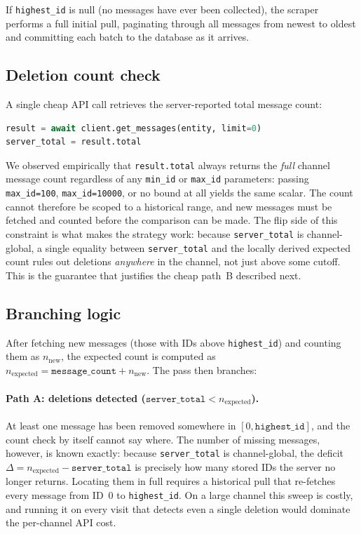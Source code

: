 If \texttt{highest\_id} is null (no messages have ever been collected), the scraper performs a full initial pull, paginating through all messages from newest to oldest and committing each batch to the database as it arrives.

\subsection{Deletion count check}

A single cheap API call retrieves the server-reported total message count:
\begin{lstlisting}[language=Python]
result = await client.get_messages(entity, limit=0)
server_total = result.total
\end{lstlisting}

We observed empirically that \texttt{result.total} always returns the \emph{full} channel message count regardless of any \texttt{min\_id} or \texttt{max\_id} parameters: passing \texttt{max\_id=100}, \texttt{max\_id=10000}, or no bound at all yields the same scalar.
The count cannot therefore be scoped to a historical range, and new messages must be fetched and counted before the comparison can be made.
The flip side of this constraint is what makes the strategy work: because \texttt{server\_total} is channel-global, a single equality between \texttt{server\_total} and the locally derived expected count rules out deletions \emph{anywhere} in the channel, not just above some cutoff. This is the guarantee that justifies the cheap path~B described next.

\subsection{Branching logic}

After fetching new messages (those with IDs above \texttt{highest\_id}) and counting them as $n_{\mathrm{new}}$, the expected count is computed as $n_{\mathrm{expected}} = \texttt{message\_count} + n_{\mathrm{new}}$.
The pass then branches:

\paragraph{Path A: deletions detected ($\texttt{server\_total} < n_{\mathrm{expected}}$).}
At least one message has been removed somewhere in $[0, \texttt{highest\_id}]$, and the count check by itself cannot say where. The number of missing messages, however, is known exactly: because \texttt{server\_total} is channel-global, the deficit $\Delta = n_{\mathrm{expected}} - \texttt{server\_total}$ is precisely how many stored IDs the server no longer returns. Locating them in full requires a historical pull that re-fetches every message from ID~0 to \texttt{highest\_id}. On a large channel this sweep is costly, and running it on every visit that detects even a single deletion would dominate the per-channel API cost.

